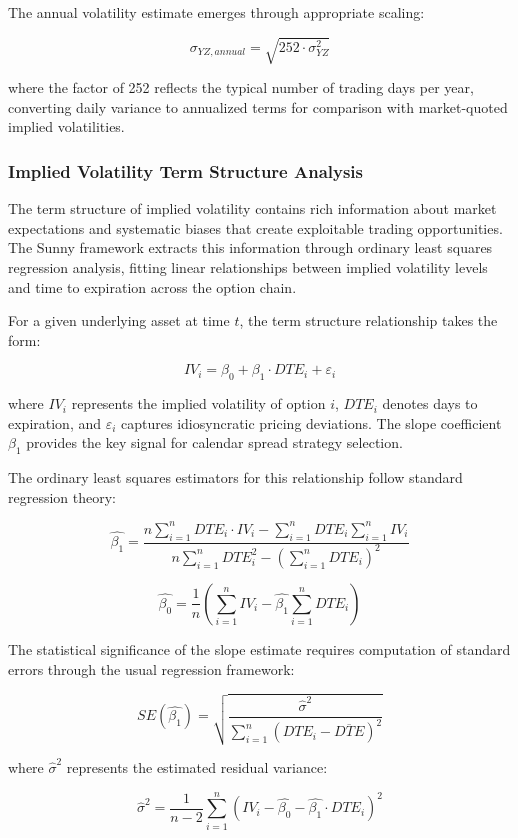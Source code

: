 \documentclass[
  american,
  11pt,
  11pt,
  letterpaper,
  onecolumn]{article}
\begin{document}
The annual volatility estimate emerges through appropriate scaling:

\[\sigma_{YZ,annual} = \sqrt{252 \cdot \sigma_{YZ}^2}\]

where the factor of 252 reflects the typical number of trading days per
year, converting daily variance to annualized terms for comparison with
market-quoted implied volatilities.

\subsubsection{Implied Volatility Term Structure
Analysis}\label{implied-volatility-term-structure-analysis}

The term structure of implied volatility contains rich information about
market expectations and systematic biases that create exploitable
trading opportunities. The Sunny framework extracts this information
through ordinary least squares regression analysis, fitting linear
relationships between implied volatility levels and time to expiration
across the option chain.

For a given underlying asset at time \(t\), the term structure
relationship takes the form:

\[IV_i = \beta_0 + \beta_1 \cdot DTE_i + \varepsilon_i\]

where \(IV_i\) represents the implied volatility of option \(i\),
\(DTE_i\) denotes days to expiration, and \(\varepsilon_i\) captures
idiosyncratic pricing deviations. The slope coefficient \(\beta_1\)
provides the key signal for calendar spread strategy selection.

The ordinary least squares estimators for this relationship follow
standard regression theory:

\[\hat{\beta_1} = \frac{n\sum_{i=1}^{n} DTE_i \cdot IV_i - \sum_{i=1}^{n} DTE_i \sum_{i=1}^{n} IV_i}{n\sum_{i=1}^{n} DTE_i^2 - \left(\sum_{i=1}^{n} DTE_i\right)^2}\]

\[\hat{\beta_0} = \frac{1}{n}\left(\sum_{i=1}^{n} IV_i - \hat{\beta_1}\sum_{i=1}^{n} DTE_i\right)\]

The statistical significance of the slope estimate requires computation
of standard errors through the usual regression framework:

\[SE(\hat{\beta_1}) = \sqrt{\frac{\hat{\sigma}^2}{\sum_{i=1}^{n}(DTE_i - \overline{DTE})^2}}\]

where \(\hat{\sigma}^2\) represents the estimated residual variance:

\[\hat{\sigma}^2 = \frac{1}{n-2}\sum_{i=1}^{n}(IV_i - \hat{\beta_0} - \hat{\beta_1} \cdot DTE_i)^2\]
\end{document}
